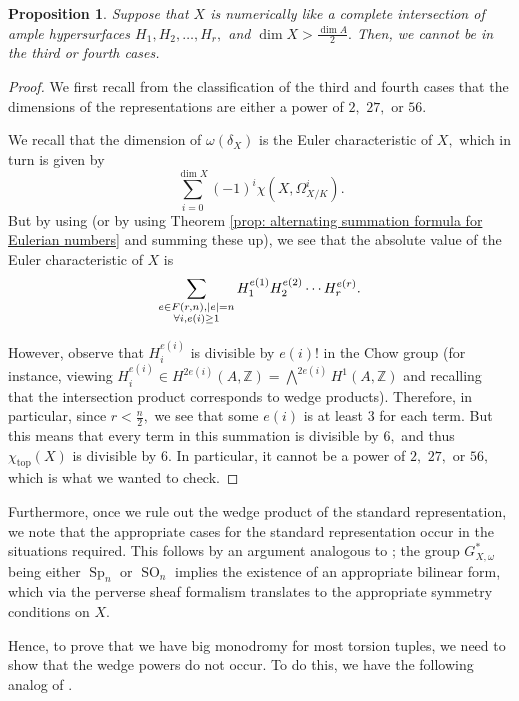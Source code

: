 \documentclass{article}
\newtheorem{prop}[thm]{Proposition}
\theoremstyle{definition}
\theoremstyle{remark}
\DeclareMathOperator{\spp}{Sp}
\DeclareMathOperator{\so}{SO}
\begin{document}
\begin{prop}\label{prop: all but the wedge representations ruled out}
Suppose that $X$ is numerically like a complete intersection of ample hypersurfaces $H_1, H_2, \ldots, H_r,$ and $\dim X > \frac{\dim A}{2}.$ Then, we cannot be in the third or fourth cases.
\end{prop}
\begin{proof}
We first recall from the classification of the third and fourth cases that the dimensions of the representations are either a power of $2,$ $27,$ or $56.$
\par We recall that the dimension of $\omega(\delta_X)$ is the Euler characteristic of $X,$ which in turn is given by \[\sum\limits_{i=0}^{\dim X} (-1)^i\chi(X, \Omega^i_{X/K}).\] But by using \cite[Lemma 2.14]{jklm23} (or by using Theorem \ref{prop: alternating summation formula for Eulerian numbers} and summing these up), we see that the absolute value of the Euler characteristic of $X$ is \[\sum\limits_{\substack{e \in F(r, n), |e| = n\\ \forall i, \space e(i) \geq 1}} H_1^{e(1)} H_2^{e(2)} \cdots H_r^{e(r)}.\] 
\par However, observe that $H_i^{e(i)}$ is divisible by $e(i)!$ in the Chow group (for instance, viewing $H_i^{e(i)} \in H^{2e(i)}(A, \mathbb{Z}) = \bigwedge^{2e(i)} H^1(A, \mathbb{Z})$ and recalling that the intersection product corresponds to wedge products). Therefore, in particular, since $r < \frac{n}{2},$ we see that some $e(i)$ is at least $3$ for each term. But this means that every term in this summation is divisible by $6,$ and thus $\chi_{\text{top}}(X)$ is divisible by $6.$ In particular, it cannot be a power of $2,$ $27,$ or $56,$ which is what we wanted to check.
\end{proof}
Furthermore, once we rule out the wedge product of the standard representation, we note that the appropriate cases for the standard representation occur in the situations required. This follows by an argument analogous to \cite[Lemma 3.11]{ls25}; the group $G_{X, \omega}^*$ being either $\spp_n$ or $\so_n$ implies the existence of an appropriate bilinear form, which via the perverse sheaf formalism translates to the appropriate symmetry conditions on $X.$
\par Hence, to prove that we have big monodromy for most torsion tuples, we need to show that the wedge powers do not occur. To do this, we have the following analog of \cite[Lemmas 3.13, 3.14]{ls25}.
\end{document}
